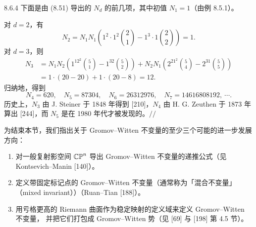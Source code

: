 \begin{wexam}{8.6.4}
下面是由 (8.51) 导出的 $N_d$ 的前几项，其中初值 $N_1=1$（由例 8.5.1）。

对 $d=2$，有
\[
  N_2=N_1N_1\left(1^2\cdot1^2\binom21-1^3\cdot1\binom22\right)=1 .
\]
对 $d=3$，则
\begin{align*}
  N_3&=N_1N_2\left(1^12^2\binom51-1^32\binom52\right)
  +N_2N_1\left(2^21^2\binom54-2^31\binom55\right)\\
  &=1\cdot(20-20)+1\cdot(20-8)=12 .
\end{align*}
归纳地，得到
\[
  N_4=620,\quad N_5=87304,\quad N_6=26312976,\quad N_7=14616808192,\ \cdots .
\]
历史上，$N_3$ 由 J. Steiner 于 1848 年得到 [210]，$N_4$ 由 H. G. Zeuthen 于 1873 年
算出 [244]，而 $N_5$ 是在 1980 年代才被发现的。\hspace*{\fill}$//$
\end{wexam}

为结束本节，我们指出关于 Gromov--Witten 不变量的至少三个可能的进一步发展方向：
\begin{enumerate}[label=(\roman*)]
  \item 对一般复射影空间 $\mathbb{CP}^n$ 导出 Gromov--Witten 不变量的递推公式（见
        Kontsevich--Manin [140]）。
  \item 定义带固定标记点的 Gromov--Witten 不变量（通常称为「混合不变量」
        （mixed invariant））（Ruan--Tian [188]）。
  \item 用亏格更高的 Riemann 曲面作为稳定映射的定义域来定义 Gromov--Witten 不变量，
        并把它们打包成 Gromov--Witten 势（见 [69] 与 [198] 第 4.5 节）。
\end{enumerate}
